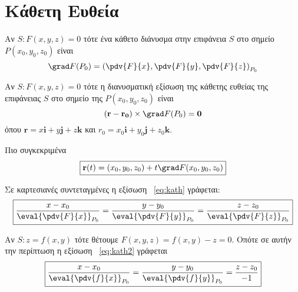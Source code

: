 \section*{Κάθετη Ευθεία}

\begin{myitemize}
  \item Αν $S: F(x,y,z)=0$ τότε ένα κάθετο διάνυσμα στην επιφάνεια $S$ 
    στο σημείο $ P(x_{0}, y_{0}, z_{0}) $ είναι
    \[
      \grad F{(P_{0})} = \left(\pdv{F}{x}, \pdv{F}{y}, \pdv{F}{z}\right)_{P_{0}}
    \]
  \item Αν $S: F(x,y,z)=0$ τότε η διανυσματική εξίσωση της κάθετης ευθείας της 
    επιφάνειας $S$ στο σημείο της $ P(x_{0}, y_{0}, z_{0}) $ είναι
    \begin{equation}\label{eq:kath}
      (\mathbf{r} - \mathbf{r_{0}}) \times \grad F(P_{0}) = \mathbf{0}
    \end{equation} 
    όπου $ \mathbf{r}=x \mathbf{i}+y \mathbf{j}+z \mathbf{k} $ και 
    $ r_{0}=x_{0} \mathbf{i}+ y _{0} \mathbf{j}+ z_{0} \mathbf{k} $.

    Πιο συγκεκριμένα 
    \[
      \boxed{\mathbf{r}(t) = (x_{0}, y_{0}, z_{0}) + t \grad F(x_{0}, y_{0}, z_{0})}
    \] 

    Σε καρτεσιανές συντεταγμένες η εξίσωση ~\eqref{eq:kath} γράφεται:
    \begin{equation}\label{eq:kath2}
      \boxed{ 
        \frac{x- x_{0}}{\eval{\pdv{F}{x}} _{P_{0}}} = 
        \frac{y- y_{0}}{\eval{\pdv{F}{y}} _{P_{0}}} = 
        \frac{z- z_{0}}{\eval{\pdv{F}{z}} _{P_{0}}}  
      }
    \end{equation}

  \item Αν $ S: z=f(x,y) $ τότε θέτουμε $ F(x,y,z) =  f(x,y) - z = 0 $. Οπότε σε
    αυτήν την περίπτωση η εξίσωση ~\eqref{eq:kath2} γράφεται
    \[
      \boxed{
        \frac{x- x_{0}}{\eval{\pdv{f}{x}} _{P_{0}}} = 
        \frac{y- y_{0}}{\eval{\pdv{f}{y}} _{P_{0}}} = 
        \frac{z- z_{0}}{-1} 
      }
    \] 
\end{myitemize}



